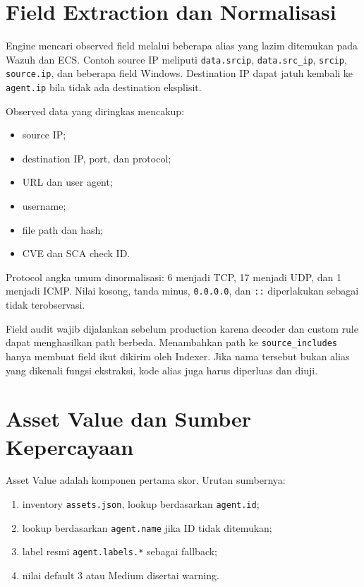 \documentclass[11pt,a4paper,oneside]{report}
\DeclareRobustCommand{\code}[1]{\nolinkurl{#1}}
\begin{document}
\chapter{Field Extraction dan Normalisasi}

Engine mencari observed field melalui beberapa alias yang lazim ditemukan pada
Wazuh dan ECS. Contoh source IP meliputi \code{data.srcip}, \code{data.src\_ip},
\code{srcip}, \code{source.ip}, dan beberapa field Windows. Destination IP dapat
jatuh kembali ke \code{agent.ip} bila tidak ada destination eksplisit.

Observed data yang diringkas mencakup:

\begin{itemize}
  \item source IP;
  \item destination IP, port, dan protocol;
  \item URL dan user agent;
  \item username;
  \item file path dan hash;
  \item CVE dan SCA check ID.
\end{itemize}

Protocol angka umum dinormalisasi: 6 menjadi TCP, 17 menjadi UDP, dan 1 menjadi
ICMP. Nilai kosong, tanda minus, \code{0.0.0.0}, dan \code{::} diperlakukan sebagai
tidak terobservasi.

Field audit wajib dijalankan sebelum production karena decoder dan custom rule
dapat menghasilkan path berbeda. Menambahkan path ke \code{source\_includes}
hanya membuat field ikut dikirim oleh Indexer. Jika nama tersebut bukan alias yang
dikenali fungsi ekstraksi, kode alias juga harus diperluas dan diuji.

\chapter{Asset Value dan Sumber Kepercayaan}

Asset Value adalah komponen pertama skor. Urutan sumbernya:

\begin{enumerate}
  \item inventory \code{assets.json}, lookup berdasarkan \code{agent.id};
  \item lookup berdasarkan \code{agent.name} jika ID tidak ditemukan;
  \item label resmi \code{agent.labels.*} sebagai fallback;
  \item nilai default 3 atau Medium disertai warning.
\end{enumerate}
\end{document}
